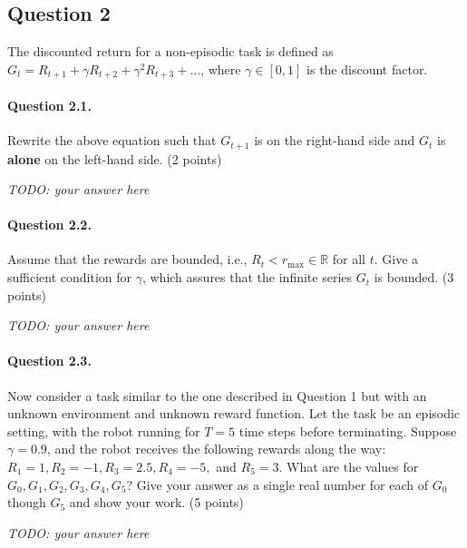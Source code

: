 \documentclass[a4paper,11pt]{article}
\begin{document}
\subsection*{Question 2}
The discounted return for a non-episodic task is defined as $G_t = R_{t+1} + \gamma R_{t+2} + \gamma^2 R_{t+3} + \ldots$, where $\gamma \in [0, 1]$ is the discount factor.

\begin{minipage}{0.9\textwidth}
\vspace{.5cm}
\paragraph{Question 2.1.}
Rewrite the above equation such that $G_{t+1}$ is on the right-hand side and $G_t$ is \textbf{alone} on the left-hand side.
(2 points)
\vspace{.5cm}

\textit{TODO: your answer here}

\end{minipage}

\begin{minipage}{0.9\textwidth}
\vspace{.5cm}
\paragraph{Question 2.2.}
Assume that the rewards are bounded, i.e., $R_t < r_{\text{max}} \in \mathbb{R}$ for all $t$.
Give a sufficient condition for $\gamma$, which assures that the infinite series $G_t$ is bounded.
(3 points)
\vspace{.5cm}

\textit{TODO: your answer here}

\end{minipage}

\begin{minipage}{0.9\textwidth}
\vspace{.5cm}
\paragraph{Question 2.3.}
Now consider a task similar to the one described in Question 1 but with an unknown environment and unknown reward function.
Let the task be an episodic setting, with the robot running for $T = 5$ time steps before terminating. Suppose $\gamma = 0.9$, and the robot receives the following rewards along the way: $R_1 = 1, R_2 = -1, R_3 = 2.5, R_4 = -5,$ and $R_5 = 3$. What are the values for $G_0, G_1, G_2, G_3, G_4, G_5$? Give your answer as a single real number for each of $G_0$ though $G_5$ and show your work.
(5 points)
\vspace{.5cm}

\textit{TODO: your answer here}

\end{minipage}
\end{document}
